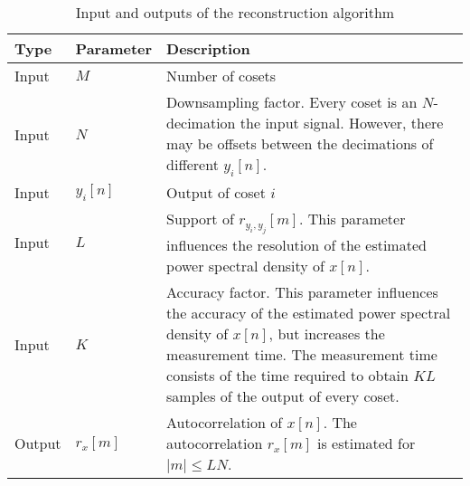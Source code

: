 \documentclass[a4paper, openany, oneside]{memoir}
\begin{document}
\begin{table}
    \centering
    \begin{tabularx}{\textwidth}{llY}
        \textbf{Type} & \textbf{Parameter} & \textbf{Description} \\ \hline
        Input & $M$ & Number of cosets \\
        Input & $N$ & Downsampling factor. Every coset is an $N$-decimation the input signal. However, there may be offsets between the decimations of different $y_i[n]$. \\
        Input & $y_i[n]$ & Output of coset $i$ \\
        Input & $L$ & Support of $r_{y_i,y_j}[m]$. This parameter influences the resolution of the estimated power spectral density of $x[n]$. \\
        Input & $K$ & Accuracy factor. This parameter influences the accuracy of the estimated power spectral density of $x[n]$, but increases the measurement time. The measurement time consists of the time required to obtain $KL$ samples of the output of every coset. \\
        Output & $r_x[m]$ & Autocorrelation of $x[n]$. The autocorrelation $r_x[m]$ is estimated for $|m| \le LN$.
    \end{tabularx}
    \caption{Input and outputs of the reconstruction algorithm}
    \label{tab:reconstruction-algorithm-inputs-outputs}
\end{table}
\end{document}
